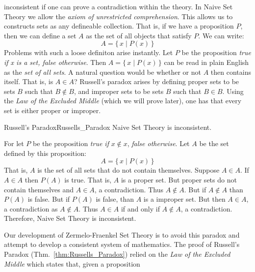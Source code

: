     inconsistent if one can prove a contradiction within the theory. In Naive
    Set Theory we allow the \textit{axiom of unrestricted comprehension}. This
    allows us to constructs sets as any defineable collection. That is, if we
    have a proposition $P$, then we can define a set $A$ as the set of all
    objects that satisfy $P$. We can write:
    \begin{equation}
        A=\big\{\,x\;|\;P(x)\,\big\}
    \end{equation}
    Problems with such a loose definiton arise instantly. Let $P$ be the
    proposition \textit{true if x is a set, false otherwise}. Then
    $A=\{\,x\;|\;P(x)\,\}$ can be read in plain English as the
    \textit{set of all sets}. A natural question would be whether or not $A$
    then contains itself. That is, is $A\in{A}$? Russell's paradox arises by
    defining proper sets to be sets $B$ such that $B\notin{B}$, and improper
    sets to be sets $B$ such that $B\in{B}$. Using the
    \textit{Law of the Excluded Middle} (which we will prove later), one has
    that every set is either proper or improper.
    \begin{ftheorem}{Russell's Paradox}{Russells_Paradox}
        Naive Set Theory is inconsistent.
    \end{ftheorem}
    \begin{bproof}
        For let $P$ be the proposition \textit{true if} $x\notin{x}$,
        \textit{false otherwise}. Let $A$ be the set defined by this
        proposition:
        \begin{equation}
            A=\big\{\,x\;|\;P(x)\,\big\}
        \end{equation}
        That is, $A$ is the set of all sets that do not contain themselves.
        Suppose $A\in{A}$. If $A\in{A}$ then $P(A)$ is true. That is, $A$ is a
        proper set. But proper sets do not contain themselves and $A\in{A}$, a
        contradiction. Thus $A\notin{A}$. But if $A\notin{A}$ than $P(A)$ is
        false. But if $P(A)$ is false, than $A$ is a improper set. But then
        $A\in{A}$, a contradiction as $A\notin{A}$. Thus $A\in{A}$ if and only
        if $A\notin{A}$, a contradiction. Therefore, Naive Set Theory is
        inconsistent.
    \end{bproof}
    Our development of Zermelo-Fraenkel Set Theory is to avoid this paradox and
    attempt to develop a consistent system of mathematics. The proof of
    Russell's Paradox (Thm.~\ref{thm:Russells_Paradox}) relied on the
    \textit{Law of the Excluded Middle} which states that, given a proposition
